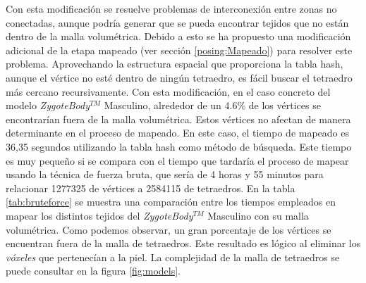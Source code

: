 Con esta modificación se resuelve problemas de interconexión entre zonas no conectadas, aunque podría generar que se pueda encontrar tejidos que no están dentro de la malla volumétrica. %
Debido a esto se ha propuesto una modificación adicional de la etapa mapeado (ver sección \ref{posing:Mapeado}) para resolver este problema. Aprovechando la estructura espacial que proporciona la \ac{tabla hash}, aunque el vértice no esté dentro de ningún tetraedro, es fácil buscar el tetraedro más cercano recursivamente. 
Con esta modificación, en el caso concreto del modelo \emph{ZygoteBody}$^{TM}$ Masculino, alrededor de un 4.6\% de los vértices se encontrarían fuera de la malla volumétrica. 
Estos vértices no afectan de manera determinante en el proceso de mapeado. En este caso, el tiempo de mapeado es 36,35 segundos utilizando la \ac{tabla hash} como método de búsqueda. Este tiempo es muy pequeño si se compara con el tiempo que tardaría el proceso de mapear usando la técnica de fuerza bruta, que sería de 4 horas y 55 minutos para relacionar 1277325 de vértices a 2584115 de tetraedros. %
En la tabla \ref{tab:bruteforce} se muestra una comparación entre los tiempos empleados en mapear los distintos tejidos del \emph{ZygoteBody}$^{TM}$ Masculino con su malla volumétrica. Como podemos observar, un gran porcentaje de los vértices se encuentran fuera de la malla de tetraedros. Este resultado es lógico al eliminar los \emph{vóxeles} que pertenecían a la piel. La complejidad de la malla de tetraedros se puede consultar en la figura \ref{fig:models}. 


